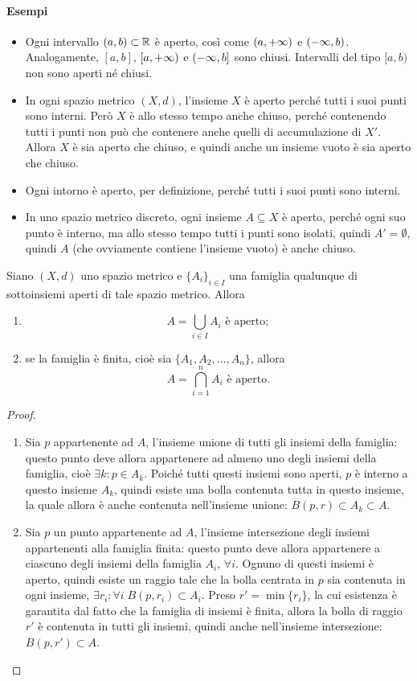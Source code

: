 \paragraph{Esempi}
\begin{itemize}
\item Ogni intervallo $(a,b)\subset\mathbb{R}$ è aperto, così come $(a,+\infty)$ e $(-\infty,b)$. Analogamente, $[a,b]$, $[a,+\infty)$ e $(-\infty,b]$ sono chiusi. Intervalli del tipo $[a,b)$ non sono aperti né chiusi.
\item In ogni spazio metrico $(X,d)$, l'insieme $X$ è aperto perché tutti i suoi punti sono interni. Però $X$ è allo stesso tempo anche chiuso, perché contenendo tutti i punti non può che contenere anche quelli di accumulazione di $X'$. Allora $X$ è sia aperto che chiuso, e quindi anche un insieme vuoto è sia aperto che chiuso. 
\item Ogni intorno è aperto, per definizione, perché tutti i suoi punti sono interni.
\item In uno spazio metrico discreto, ogni insieme $A\subseteq X$ è aperto, perché ogni suo punto è interno, ma allo stesso tempo tutti i punti sono isolati, quindi $A'=\emptyset$, quindi $A$ (che ovviamente contiene l'insieme vuoto) è anche chiuso.
\end{itemize}
\begin{teorema}
Siano $(X,d)$ uno spazio metrico e $\{A_i\}_{i\in I}$ una famiglia qualunque di sottoinsiemi aperti di tale spazio metrico. Allora
\begin{enumerate}
\item\[
A=\bigcup_{i\in I} A_i\text{ è aperto};
\]
\item se la famiglia è finita, cioè sia $\{A_1,A_2,\dots,A_n\}$, allora
\[
A=\bigcap_{i=1}^n A_i\text{ è aperto}.
\]
\end{enumerate}
\end{teorema}
\begin{proof}
\begin{enumerate}
\item Sia $p$ appartenente ad $A$, l'insieme unione di tutti gli insiemi della famiglia: questo punto deve allora appartenere ad almeno uno degli insiemi della famiglia, cioè $\exists k\colon p\in A_k$. Poiché tutti questi insiemi sono aperti, $p$ è interno a questo insieme $A_k$, quindi esiste una bolla contenuta tutta in questo insieme, la quale allora è anche contenuta nell'insieme unione: $B(p,r)\subset A_k\subset A$.
\item Sia $p$ un punto appartenente ad $A$, l'insieme intersezione degli insiemi appartenenti alla famiglia finita: questo punto deve allora appartenere a ciascuno degli insiemi della famiglia $A_i,\,\forall i$. Ognuno di questi insiemi è aperto, quindi esiste un raggio tale che la bolla centrata in $p$ sia contenuta in ogni insieme, $\exists r_i\colon \forall i\;B(p,r_i)\subset A_i$. Preso $r'=\min\{r_i\}$, la cui esistenza è garantita dal fatto che la famiglia di insiemi è finita, allora la bolla di raggio $r'$ è contenuta in tutti gli insiemi, quindi anche nell'insieme intersezione: $B(p,r')\subset A$.
\end{enumerate}
\end{proof}
